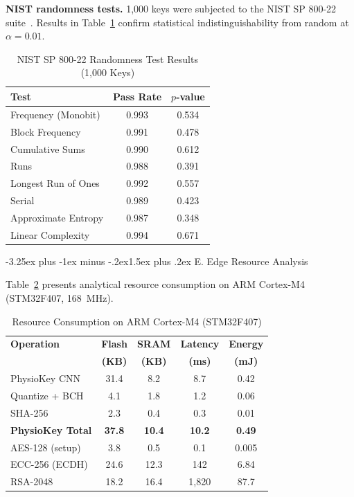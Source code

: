 \documentclass[10pt,twocolumn]{article}
\makeatletter
\renewcommand{\subsection}{\@startsection{subsection}{2}{\z@}%
  {-3.25ex plus -1ex minus -.2ex}{1.5ex plus .2ex}%
  {\normalfont\normalsize\bfseries\itshape}}
\makeatother
\begin{document}
\textbf{NIST randomness tests.} 1,000 keys were subjected to the NIST SP 800-22 suite~\cite{bassham2010nist}. Results in Table~\ref{tab:nist} confirm statistical indistinguishability from random at $\alpha = 0.01$.

\begin{table}[!t]
\centering
\caption{NIST SP 800-22 Randomness Test Results (1,000 Keys)}
\label{tab:nist}
\small
\begin{tabular}{l|c|c}
\hline
\textbf{Test} & \textbf{Pass Rate} & \textbf{$p$-value} \\
\hline\hline
Frequency (Monobit) & 0.993 & 0.534 \\
\hline
Block Frequency & 0.991 & 0.478 \\
\hline
Cumulative Sums & 0.990 & 0.612 \\
\hline
Runs & 0.988 & 0.391 \\
\hline
Longest Run of Ones & 0.992 & 0.557 \\
\hline
Serial & 0.989 & 0.423 \\
\hline
Approximate Entropy & 0.987 & 0.348 \\
\hline
Linear Complexity & 0.994 & 0.671 \\
\hline
\end{tabular}
\end{table}

\subsection{E. Edge Resource Analysis}
\label{subsec:resource_analysis}

Table~\ref{tab:resources} presents analytical resource consumption on ARM Cortex-M4 (STM32F407, 168~MHz).

\begin{table}[!t]
\centering
\caption{Resource Consumption on ARM Cortex-M4 (STM32F407)}
\label{tab:resources}
\small
\begin{tabular}{l|c|c|c|c}
\hline
\textbf{Operation} & \textbf{Flash} & \textbf{SRAM} & \textbf{Latency} & \textbf{Energy} \\
 & \textbf{(KB)} & \textbf{(KB)} & \textbf{(ms)} & \textbf{(mJ)} \\
\hline\hline
PhysioKey CNN & 31.4 & 8.2 & 8.7 & 0.42 \\
\hline
Quantize + BCH & 4.1 & 1.8 & 1.2 & 0.06 \\
\hline
SHA-256 & 2.3 & 0.4 & 0.3 & 0.01 \\
\hline
\textbf{PhysioKey Total} & \textbf{37.8} & \textbf{10.4} & \textbf{10.2} & \textbf{0.49} \\
\hline\hline
AES-128 (setup) & 3.8 & 0.5 & 0.1 & 0.005 \\
\hline
ECC-256 (ECDH) & 24.6 & 12.3 & 142 & 6.84 \\
\hline
RSA-2048 & 18.2 & 16.4 & 1,820 & 87.7 \\
\hline
\end{tabular}
\end{table}
\end{document}
